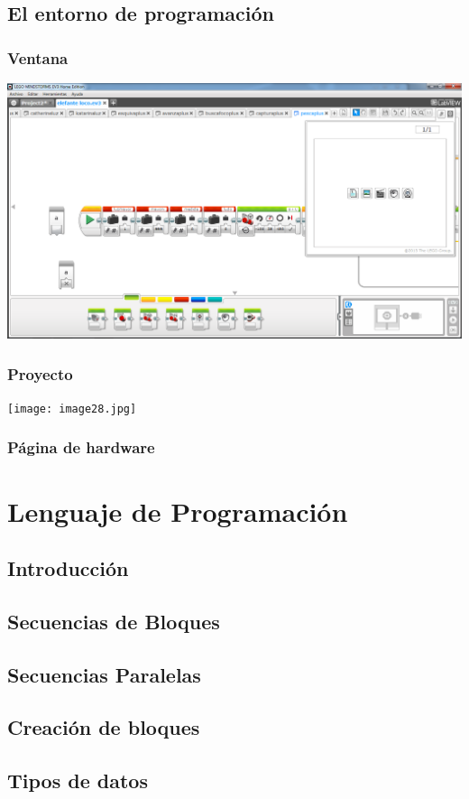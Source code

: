 \documentclass[12pt,a4paper]{article}
\begin{document}
\subsection{El entorno de programación}
\subsubsection{Ventana}
\includegraphics[scale=0.45]{Programa.PNG}
\subsubsection{Proyecto}
\texttt{[image: image28.jpg]}
\subsubsection{Página de hardware}
\section{Lenguaje de Programación}
\subsection{Introducción}
\subsection{Secuencias de Bloques}
\subsection{Secuencias Paralelas}
\subsection{Creación de bloques}
\subsection{Tipos de datos}
\end{document}
